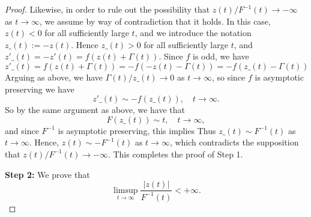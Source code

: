 \documentclass[a4paper,10pt,reqno]{amsart}
\numberwithin{equation}{section}
\theoremstyle{definition}
\theoremstyle{remark}
\DeclareMathOperator{\1}{\mathbbm 1}
\begin{document}
\begin{proof}
		Likewise, in order to rule out the possibility that $z(t)/F^{-1}(t)\to -\infty$ as $t\to\infty$, we assume by way of contradiction that it holds. In this case, $z(t) < 0$ for all sufficiently large $t$, and we introduce the notation $z\_(t) := -z(t)$. Hence $z\_(t) > 0$ for all sufficiently large $t$, and $z'\_(t) = - z'(t)=f(z(t)+\Gamma(t))$. 
		Since $f$ is odd, we have 
		\[
		z'\_(t) =f(z(t)+\Gamma(t))=-f(-z(t)-\Gamma(t))=-f(z\_(t)-\Gamma(t))
		\] 
		Arguing as above, we have $\Gamma(t)/z\_(t)\to 0$ as $t\to\infty$, so since $f$ is asymptotic preserving we have  
		\[
		z'\_(t) \sim -f(z\_(t)), \quad t\to\infty.
		\]
		So by the same argument as above, we have that 
		\[
		F(z\_(t)) \sim t, \quad t \to \infty,
		\]
		and since $F^{-1}$ is asymptotic preserving, this implies 
		Thus $z\_(t) \sim F^{-1}(t)$ as $t \to \infty$. 
		Hence, $z(t) \sim -F^{-1}(t)$ as $t \to \infty$, which contradicts the supposition that $z(t)/F^{-1}(t)\to -\infty$. This completes the proof of Step 1.
		
		
		\textbf{Step 2:} We prove that 
		\[
		\limsup_{t \to \infty} \frac{|z(t)|}{F^{-1}(t)} < +\infty.
		\]
		

\end{proof}
\end{document}

